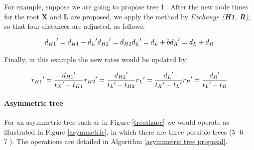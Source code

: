 \documentclass{bmcart}
\begin{document}
For example, suppose we are going to propose tree \textcircled1. After the new node times for the root \textbf{X} and \textbf{L} are proposed, we apply the method by \textit{Exchange (\textbf{H1}, \textbf{R})}, so that four distances are adjusted, as follows:

\begin{equation}\label{example1.1}
{d_{H1}}' = {d_{H1}} - {d_L}'  \\
{d_{H2}}' = {d_{H2}} \\
{d_L}' = {d_L} + b \\
{d_R}' = {d_L} + {d_R}
\end{equation}

Finally, in this example the new rates would be updated by:

\begin{equation}\label{example1.2}
{r_{H1}}' = \frac{{{d_{H1}}'}}{{{t_X}' - {t_{H1}}}} \\
{r_{H2}}' = \frac{{{d_{H2}}'}}{{{t_L}' - {t_{H2}}}} \\
{r_L}' = \frac{{{d_L}'}}{{{t_X}' - {t_L}'}} \\
{r_R}' = \frac{{{d_R}'}}{{{t_L}' - {t_R}}}
\end{equation}

\paragraph*{Asymmetric tree}

For an asymmetric tree such as in Figure \ref{treeshape} we would operate as illustrated in Figure \ref{asymmetric}, in which there are three possible trees (\textcircled5 \textcircled6 \textcircled7). The operations are detailed in Algorithm \ref{asymmetric tree proposal}.
\end{document}
